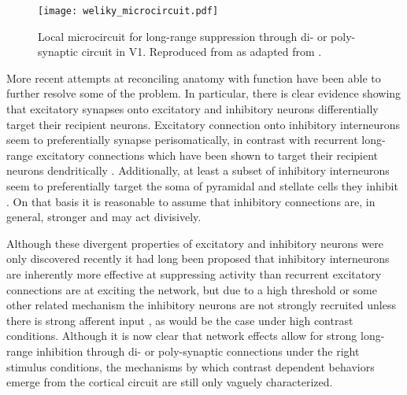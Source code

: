 \begin{figure}
	\centering
        \texttt{[image: weliky\_microcircuit.pdf]}
	\caption{Local microcircuit for long-range suppression through
          di- or poly-synaptic circuit in V1. Reproduced from
          \cite{Miikkulainen2005b} as adapted from \cite{Weliky1995}.}
	\label{V1MicroCircuit}
\end{figure}

More recent attempts at reconciling anatomy with function have been
able to further resolve some of the problem. In particular, there is
clear evidence showing that excitatory synapses onto excitatory and
inhibitory neurons differentially target their recipient
neurons. Excitatory connection onto inhibitory interneurons seem to
preferentially synapse perisomatically, in contrast with recurrent
long-range excitatory connections which have been shown to target
their recipient neurons dendritically
\citep{Gilbert1990,McGuire1991}. Additionally, at least a subset of
inhibitory interneurons seem to preferentially target the soma of
pyramidal and stellate cells they inhibit \citep{Markram2004}. On that
basis it is reasonable to assume that inhibitory connections are, in
general, stronger and may act divisively.

Although these divergent properties of excitatory and inhibitory
neurons were only discovered recently it had long been proposed that
inhibitory interneurons are inherently more effective at suppressing
activity than recurrent excitatory connections are at exciting the
network, but due to a high threshold or some other related mechanism
the inhibitory neurons are not strongly recruited unless there is
strong afferent input \citep{Sillito1979}, as would be the case under
high contrast conditions. Although it is now clear that network
effects allow for strong long-range inhibition through di- or
poly-synaptic connections under the right stimulus conditions, the
mechanisms by which contrast dependent behaviors emerge from the
cortical circuit are still only vaguely characterized.

